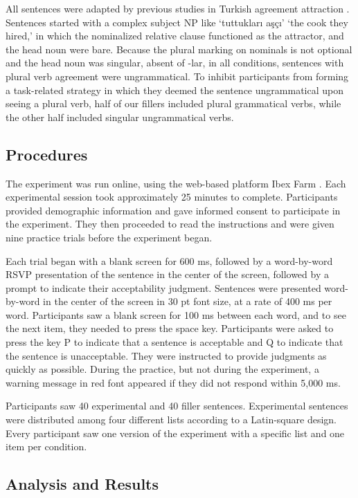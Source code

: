 \documentclass[
  authoryear,
  3p]{elsarticle}
\begin{document}
All sentences were adapted by previous studies in Turkish agreement
attraction \citep{LagoEtAl2019, TurkLogacev2024}. Sentences started with
a complex subject NP like `tuttukları aşçı' `the cook they hired,' in
which the nominalized relative clause functioned as the attractor, and
the head noun were bare. Because the plural marking on nominals is not
optional and the head noun was singular, absent of -lar, in all
conditions, sentences with plural verb agreement were ungrammatical. To
inhibit participants from forming a task-related strategy in which they
deemed the sentence ungrammatical upon seeing a plural verb, half of our
fillers included plural grammatical verbs, while the other half included
singular ungrammatical verbs.

\subsection{Procedures}\label{procedures}

The experiment was run online, using the web-based platform Ibex Farm
\citep{Drummond2013}. Each experimental session took approximately 25
minutes to complete. Participants provided demographic information and
gave informed consent to participate in the experiment. They then
proceeded to read the instructions and were given nine practice trials
before the experiment began.

Each trial began with a blank screen for 600 ms, followed by a
word-by-word RSVP presentation of the sentence in the center of the
screen, followed by a prompt to indicate their acceptability judgment.
Sentences were presented word-by-word in the center of the screen in 30
pt font size, at a rate of 400 ms per word. Participants saw a blank
screen for 100 ms between each word, and to see the next item, they
needed to press the space key. Participants were asked to press the key
P to indicate that a sentence is acceptable and Q to indicate that the
sentence is unacceptable. They were instructed to provide judgments as
quickly as possible. During the practice, but not during the experiment,
a warning message in red font appeared if they did not respond within
5,000 ms.

Participants saw 40 experimental and 40 filler sentences. Experimental
sentences were distributed among four different lists according to a
Latin-square design. Every participant saw one version of the experiment
with a specific list and one item per condition.

\subsection{Analysis and Results}\label{analysis-and-results}
\end{document}

